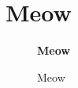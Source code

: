 \section{Meow}

\begin{figure}[H]
	\begin{center}
        \textbf{Meow}
        \caption{Meow}
	\end{center}
\end{figure}